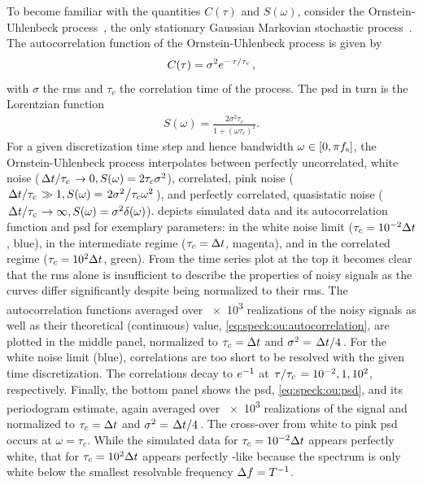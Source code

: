 To become familiar with the quantities $C(\tau)$ and $S(\omega)$, consider the Ornstein-Uhlenbeck process~\cite{Uhlenbeck1930}, the only stationary Gaussian Markovian stochastic process~\cite{VanKampen1976}.
The autocorrelation function of the Ornstein-Uhlenbeck process is given by
\begin{align}\label{eq:speck:ou:autocorrelation}
    C(\tau) = \sigma^2\e^{-\flatfrac{\tau}{\tau_c}},
\end{align}
with $\sigma$ the \gls{rms} and $\tau_c$ the correlation time of the process.
The \gls{psd} in turn is the Lorentzian function
\begin{align}\label{eq:speck:ou:psd}
    S(\omega) = \frac{2\sigma^2\tau_c}{1 + (\omega\tau_c)^2}.
\end{align}
For a given discretization time step \dt and hence bandwidth $\omega\in [0, \pi f_{\mathrm{s}}]$, the Ornstein-Uhlenbeck process interpolates between perfectly uncorrelated, white noise ($\flatfrac{\dt}{\tau_c}\to 0, S(\omega) = 2\tau_c\sigma^2$), correlated, pink noise ($\flatfrac{\dt}{\tau_c}\gg 1, S(\omega) = \flatfrac{2\sigma^2}{\tau_c\omega^2}$), and perfectly correlated, quasistatic noise ($\flatfrac{\dt}{\tau_c}\to\infty, S(\omega) = \sigma^2\delta(\omega)$).
 depicts simulated data and its autocorrelation function and \gls{psd} for exemplary parameters: in the white noise limit ($\tau_c = \num{e-2}\Delta t$, blue), in the intermediate regime ($\tau_c = \Delta t$, magenta), and in the correlated regime ($\tau_c = \num{e+2}\Delta t$, green).
From the time series plot at the top it becomes clear that the \gls{rms} alone is insufficient to describe the properties of noisy signals as the curves differ significantly despite being normalized to their \gls{rms}.
The autocorrelation functions averaged over \num{e3} realizations of the noisy signals as well as their theoretical (continuous) value, \cref{eq:speck:ou:autocorrelation}, are plotted in the middle panel, normalized to $\tau_c=\Delta t$ and $\sigma^2=\flatfrac{\dt}{4}$.
For the white noise limit (blue), correlations are too short to be resolved with the given time discretization.
The correlations decay to $e^{-1}$ at $\flatfrac{\tau}{\tau_c}=\num{e-2},\num{e0},\num{e+2}$, respectively.
Finally, the bottom panel shows the \gls{psd}, \cref{eq:speck:ou:psd}, and its periodogram estimate, again averaged over \num{e3} realizations of the signal and normalized to $\tau_c=\Delta t$ and $\sigma^2=\flatfrac{\dt}{4}$.
The cross-over from white to pink \gls{psd} occurs at $\omega = \tau_c$.
While the simulated data for $\tau_c = \num{e-2}\Delta t$ appears perfectly white, that for $\tau_c = \num{e2}\Delta t$ appears perfectly \oneoverf-like because the spectrum is only white below the smallest resolvable frequency $\Delta f = T^{-1}$.

